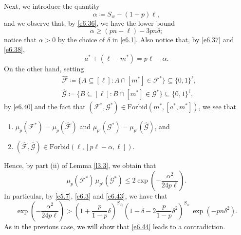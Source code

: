 \documentclass[10pt,a4paper]{amsart}
\theoremstyle{remark}
\newcommand{\meg}{\geqslant}
\newcommand{\mik}{\leqslant}
\newcommand{\Fcal}{\mathcal{F}}
\newcommand{\Gcal}{\mathcal{G}}
\begin{document}
Next, we introduce the quantity
\begin{equation} \label{e6.38}
\alpha\coloneqq S_w-(1-p)\ell,
\end{equation}
and we observe that, by \eqref{e6.36}, we have the lower bound
\begin{equation} \label{e6.39}
\alpha \meg \left(pn-\ell\right)-3pn\delta;
\end{equation}
notice that $\alpha>0$ by the choice of $\delta$ in \eqref{e6.1}.
Also notice that, by \eqref{e6.37} and \eqref{e6.38},
\begin{equation} \label{e6.40}
a^*+(\ell-m^*)=p\ell-\alpha.
\end{equation}
On the other hand, setting
\begin{align}
\label{e6.41} & \widehat{\Fcal}\coloneqq \{A\subseteq [\ell]:
A\cap [m^*]\in \Fcal^*\}\subseteq \{0,1\}^\ell, \\
\label{e6.42} & \widehat{\Gcal}\coloneqq \{B\subseteq [\ell]:
B\cap [m^*]\in \Gcal^*\}\subseteq \{0,1\}^\ell,
\end{align}
by \eqref{e6.40} and the fact that $(\Fcal^*,\Gcal^*)\in\mathrm{Forbid}(m^*,[a^*,m^*])$, we see that
\begin{enumerate}
\item[(i)] $\mu_p(\Fcal^*)=\mu_p(\widehat{\Fcal})$
and $\mu_{p'}(\Gcal^*)=\mu_{p'}(\widehat{\Gcal})$, and
\item[(ii)] $(\widehat{\Fcal},\widehat{\Gcal})\in \mathrm{Forbid}(\ell,[p\ell-\alpha,\ell])$.
\end{enumerate}
Hence, by part (ii) of Lemma \ref{l3.3}, we obtain that
\begin{equation} \label{e6.43}
\mu_p(\Fcal^*)\, \mu_{p'}(\Gcal^*)\mik 2\exp\left(-\frac{\alpha^2}{24p\ell}\right).
\end{equation}
In particular, by \eqref{e5.7}, \eqref{e6.3} and \eqref{e6.43}, we have that
\begin{equation} \label{e6.44}
\exp\left(-\frac{\alpha^2}{24p\ell}\right) > \left(1+\frac{p}{1-p}\delta\right)^{S_{d_2}}
\left(1-\delta-2\frac{p}{1-p}\delta^2\right)^{S_w}\, \exp(-pn\delta^2).
\end{equation}
As in the previous case, we will show that \eqref{e6.44} leads to a contradiction.
\end{document}
